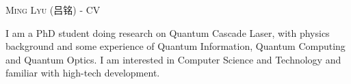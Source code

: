 \documentclass[localFont,alternative]{yaac-another-awesome-cv}
\begin{document}
 
\makecvheader 
\makecvfooter{\textsc{\today}} %
		{\textsc{Ming Lyu (吕铭) - CV}}
		{\thepage}
\par{
	I am a PhD student doing research on Quantum Cascade Laser, with physics
	background and some experience of Quantum Information, Quantum Computing 
	and Quantum Optics. I am interested in Computer Science and Technology
	and familiar with high-tech development. 
}
	
	
	
	
	
\end{document}
